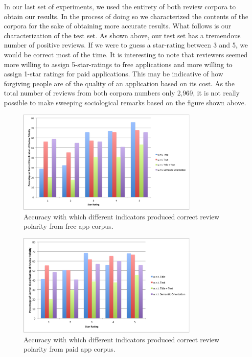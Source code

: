 \documentclass[11pt]{report} %
\begin{document}
In our last set of experiments, we used the entirety of both review corpora to obtain our results. In the process of doing so we characterized the contents of the corpora for the sake of obtaining more accurate results. What follows is our characterization of the test set. As shown above, our test set has a tremendous number of positive reviews. If we were to guess a star-rating between 3 and 5, we would be correct most of the time. It is interesting to note that reviewers seemed more willing to assign 5-star-ratings to free applications and more willing to assign 1-star ratings for paid applications. This may be indicative of how forgiving people are of the quality of an application based on its cost. As the total number of reviews from both corpora numbers only 2,969, it is not really possible to make sweeping sociological remarks based on the figure shown above. 	


	\begin{figure}[H]
	\centering
	\includegraphics[width=0.8\textwidth]{data/pmi-cue-free-pol-acc.png}
	\caption{Accuracy with which different indicators produced correct review polarity from free app corpus.}
	\label{fig:pmi-cue-free-pol-acc}
	\end{figure}

	\begin{figure}[H]
	\centering
	\includegraphics[width=0.8\textwidth]{data/pmi-cue-paid-pol-acc.png}
	\caption{Accuracy with which different indicators produced correct review polarity from paid app corpus.}
	\label{fig:pmi-cue-paid-pol-acc}
	\end{figure}
\end{document}
